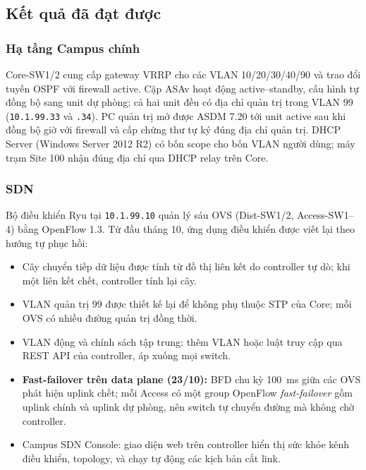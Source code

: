 \subsection{Kết quả đã đạt được}

\subsubsection{Hạ tầng Campus chính}

Core-SW1/2 cung cấp gateway VRRP cho các VLAN 10/20/30/40/90 và trao đổi tuyến OSPF với firewall active. Cặp ASAv hoạt động active--standby, cấu hình tự đồng bộ sang unit dự phòng; cả hai unit đều có địa chỉ quản trị trong VLAN 99 (\texttt{10.1.99.33} và \texttt{.34}). PC quản trị mở được ASDM 7.20 tới unit active sau khi đồng bộ giờ với firewall và cấp chứng thư tự ký đúng địa chỉ quản trị. DHCP Server (Windows Server 2012 R2) có bốn scope cho bốn VLAN người dùng; máy trạm Site 100 nhận đúng địa chỉ qua DHCP relay trên Core.

\subsubsection{SDN}

Bộ điều khiển Ryu tại \texttt{10.1.99.10} quản lý sáu OVS (Dist-SW1/2, Access-SW1--4) bằng OpenFlow 1.3. Từ đầu tháng 10, ứng dụng điều khiển được viết lại theo hướng tự phục hồi:

\begin{itemize}
    \item Cây chuyển tiếp dữ liệu được tính từ đồ thị liên kết do controller tự dò; khi một liên kết chết, controller tính lại cây.
    \item VLAN quản trị 99 được thiết kế lại để không phụ thuộc STP của Core; mỗi OVS có nhiều đường quản trị đồng thời.
    \item VLAN động và chính sách tập trung: thêm VLAN hoặc luật truy cập qua REST API của controller, áp xuống mọi switch.
    \item \textbf{Fast-failover trên data plane (23/10):} BFD chu kỳ 100~ms giữa các OVS phát hiện uplink chết; mỗi Access có một group OpenFlow \textit{fast-failover} gồm uplink chính và uplink dự phòng, nên switch tự chuyển đường mà không chờ controller.
    \item Campus SDN Console: giao diện web trên controller hiển thị sức khỏe kênh điều khiển, topology, và chạy tự động các kịch bản cắt link.
\end{itemize}

